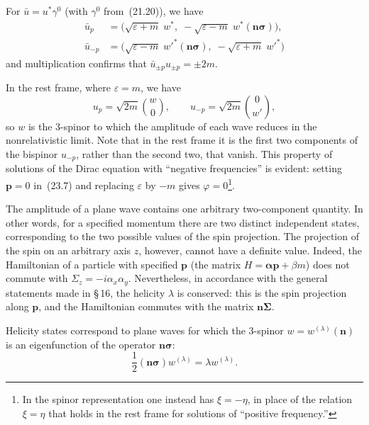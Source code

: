 For $\bar u = u^*\gamma^0$ (with $\gamma^0$ from~(21.20)), we have
\begin{equation}
\begin{aligned}
\bar u_p &= \bigl(\sqrt{\varepsilon + m}\;w^*,\; -\sqrt{\varepsilon - m}\;w^*(\mathbf{n}\boldsymbol{\sigma})\bigr),\\
\bar u_{-p} &= \bigl(\sqrt{\varepsilon - m}\;w'^*(\mathbf{n}\boldsymbol{\sigma}),\; -\sqrt{\varepsilon + m}\;w'^*\bigr)
\end{aligned}
\tag{23.11}
\end{equation}
and multiplication confirms that $\bar u_{\pm p}u_{\pm p} = \pm 2m$.

In the rest frame, where $\varepsilon = m$, we have
\begin{equation}
u_p = \sqrt{2m}\binom{w}{0},\qquad u_{-p} = \sqrt{2m}\binom{0}{w'},
\tag{23.12}
\end{equation}
so $w$ is the 3-spinor to which the amplitude of each wave reduces in the nonrelativistic limit. Note that in the rest frame it is the first two components of the bispinor $u_{-p}$, rather than the second two, that vanish. This property of solutions of the Dirac equation with ``negative frequencies'' is evident: setting $\mathbf{p} = 0$ in~(23.7) and replacing $\varepsilon$ by $-m$ gives $\varphi = 0$\footnote{In the spinor representation one instead has $\xi = -\eta$, in place of the relation $\xi = \eta$ that holds in the rest frame for solutions of ``positive frequency.''}.

The amplitude of a plane wave contains one arbitrary two-component quantity. In other words, for a specified momentum there are two distinct independent states, corresponding to the two possible values of the spin projection. The projection of the spin on an arbitrary axis $z$, however, cannot have a definite value. Indeed, the Hamiltonian of a particle with specified $\mathbf{p}$ (the matrix $H = \boldsymbol{\alpha}\mathbf{p} + \beta m$) does not commute with $\Sigma_z = -i\alpha_x\alpha_y$. Nevertheless, in accordance with the general statements made in \S\,16, the helicity $\lambda$ is conserved: this is the spin projection along $\mathbf{p}$, and the Hamiltonian commutes with the matrix $\mathbf{n}\boldsymbol{\Sigma}$.

Helicity states correspond to plane waves for which the 3-spinor $w = w^{(\lambda)}(\mathbf{n})$ is an eigenfunction of the operator $\mathbf{n}\boldsymbol{\sigma}$:
\begin{equation}
\frac{1}{2}(\mathbf{n}\boldsymbol{\sigma})w^{(\lambda)} = \lambda w^{(\lambda)}.
\tag{23.13}
\end{equation}

